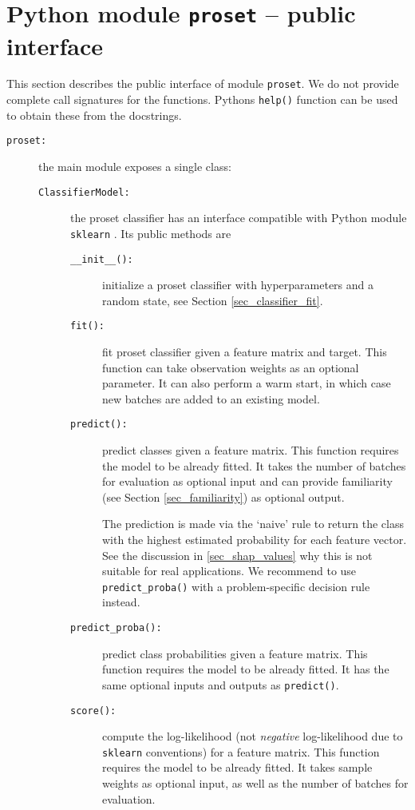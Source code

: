 \section{Python module \texttt{proset} -- public interface}
\label{sec_proset_module}
%
This section describes the public interface of module \texttt{proset}.
We do not provide complete call signatures for the functions.
Pythons \texttt{help()} function can be used to obtain these from the docstrings.
%
\begin{description}
\item[\texttt{proset:}] the main module exposes a single class:
%
\begin{description}
\item[\texttt{ClassifierModel:}] the proset classifier has an interface compatible with Python module \texttt{sklearn} \cite{Pedregosa_11}.
Its public methods are
%
\begin{description}
\item[\texttt{\_\_init\_\_():}] initialize a proset classifier with hyperparameters and a random state, see Section \ref{sec_classifier_fit}.
%
\item[\texttt{fit():}] fit proset classifier given a feature matrix and target.
This function can take observation weights as an optional parameter.
It can also perform a warm start, in which case new batches are added to an existing model.
%
\item[\texttt{predict():}] predict classes given a feature matrix.
This function requires the model to be already fitted.
It takes the number of batches for evaluation as optional input and can provide familiarity (see Section \ref{sec_familiarity}) as optional output.\par
%
The prediction is made via the `naive'  rule to return the class with the highest estimated probability for each feature vector.
See the discussion in \ref{sec_shap_values} why this is not suitable for real applications.
We recommend to use \texttt{predict\_proba()} with a problem-specific decision rule instead.
%
\item[\texttt{predict\_proba():}] predict class probabilities given a feature matrix.
This function requires the model to be already fitted.
It has the same optional inputs and outputs as \texttt{predict()}.
%
\item[\texttt{score():}] compute the log-likelihood (not \textit{negative} log-likelihood due to \texttt{sklearn} conventions) for a feature matrix.
This function requires the model to be already fitted.
It takes sample weights as optional input, as well as the number of batches for evaluation.

\end{description}
\end{description}
\end{description}
